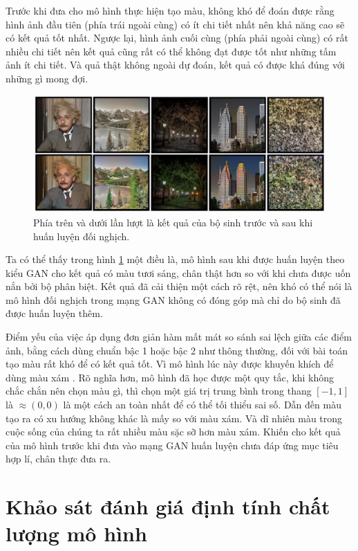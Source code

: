 \documentclass[a4paper, 12pt]{report}
\begin{document}
Trước khi đưa cho mô hình thực hiện tạo màu, không khó để đoán được rằng hình ảnh đầu tiên (phía trái ngoài cùng) có ít chi tiết nhất nên khả năng cao sẽ có kết quả tốt nhất.
Ngược lại, hình ảnh cuối cùng (phía phải ngoài cùng) có rất nhiều chi tiết nên kết quả cũng rất có thể không đạt được tốt như những tấm ảnh ít chi tiết.
Và quả thật không ngoài dự đoán, kết quả có được khá đúng với những gì mong đợi.

\begin{figure}[!h]
\captionsetup{width=0.8\textwidth}
\centering
\includegraphics[width=15cm]{images/4_3.PNG}
\caption{Phía trên và dưới lần lượt là kết quả của bộ sinh trước và sau khi huấn luyện đối nghịch.}
\label{fig:comparesimpleandgan}
\end{figure}


Ta có thể thấy trong hình \ref{fig:comparesimpleandgan} một điều là, mô hình sau khi được huấn luyện theo kiểu GAN cho kết quả có màu tươi sáng, chân thật hơn so với khi chưa được uốn nắn bởi bộ phân biệt.
Kết quả đã cải thiện một cách rõ rệt, nên khó có thể nói là mô hình đối nghịch trong mạng GAN không có đóng góp mà chỉ do bộ sinh đã được huấn luyện thêm.\vspace{5pt}

Điểm yếu của việc áp dụng đơn giản hàm mất mát so sánh sai lệch giữa các điểm ảnh, bằng cách dùng chuẩn bậc 1 hoặc bậc 2 như thông thường, đối với bài toán tạo màu rất khó để có kết quả tốt.
Vì mô hình lúc này được khuyến khích để dùng màu xám \cite{zhangcolorization}.
Rõ nghĩa hơn, mô hình đã học được một quy tắc, khi không chắc chắn nên chọn màu gì, thì chọn một giá trị trung bình trong thang $[-1, 1]$ là $\approx (0, 0)$ là một cách an toàn nhất để có thể tối thiểu sai số.
Dẫn đến màu tạo ra có xu hướng không khác là mấy so với màu xám.
Và dĩ nhiên màu trong cuộc sống của chúng ta rất nhiều màu sặc sỡ hơn màu xám.
Khiến cho kết quả của mô hình trước khi đưa vào mạng GAN huấn luyện chưa đáp ứng mục tiêu hợp lí, chân thực đưa ra.

\section{Khảo sát đánh giá định tính chất lượng mô hình}\label{surveyforevaluation}
\end{document}
